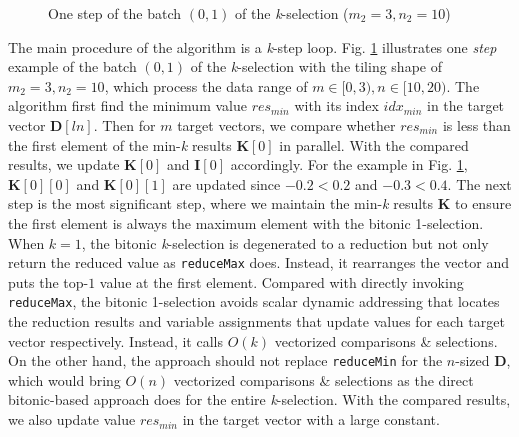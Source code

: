 \documentclass[12pt]{extbook}
\begin{document}
\begin{figure}[tbp]
    \caption{One step of the batch $(0, 1)$ of the \textit{k}-selection ($m_2 = 3, n_2 = 10$)}
    \label{fig:single_k_sel}
    \end{figure}

The main procedure of the algorithm is a \textit{k}-step loop. Fig. \ref{fig:single_k_sel} illustrates one \textit{step} example of the batch $(0, 1)$ of the \textit{k}-selection with the tiling shape of $m_2 = 3, n_2 = 10$, which process the data range of $m \in [0, 3), n \in [10, 20)$. The algorithm first find the minimum value $res_{min}$ with its index $idx_{min}$ in the target vector $\textbf{D}[ln]$. Then for $m$ target vectors, we compare whether $res_{min}$ is less than the first element of the min-\textit{k} results $\textbf{K}[0]$ in parallel. With the compared results, we update $\textbf{K}[0]$ and $\textbf{I}[0]$ accordingly. For the example in Fig. \ref{fig:single_k_sel}, $\textbf{K}[0][0]$ and $\textbf{K}[0][1]$ are updated since $-0.2 < 0.2$ and $-0.3 < 0.4$. The next step is the most significant step, where we maintain the min-\textit{k} results $\textbf{K}$ to ensure the first element is always the maximum element with the bitonic 1-selection. When $k=1$, the bitonic \textit{k}-selection is degenerated to a reduction but not only return the reduced value as \verb|reduceMax| does. Instead, it rearranges the vector and puts the top-$1$ value at the first element. Compared with directly invoking \verb|reduceMax|, the bitonic 1-selection avoids scalar dynamic addressing that locates the reduction results and variable assignments that update values for each target vector respectively. Instead, it calls $O(k)$ vectorized comparisons \& selections. On the other hand, the approach should not replace \verb|reduceMin| for the $n$-sized $\textbf{D}$, which would bring $O(n)$ vectorized comparisons \& selections as the direct bitonic-based approach does for the entire \textit{k}-selection. With the compared results, we also update value $res_{min}$ in the target vector with a large constant. 
\end{document}
